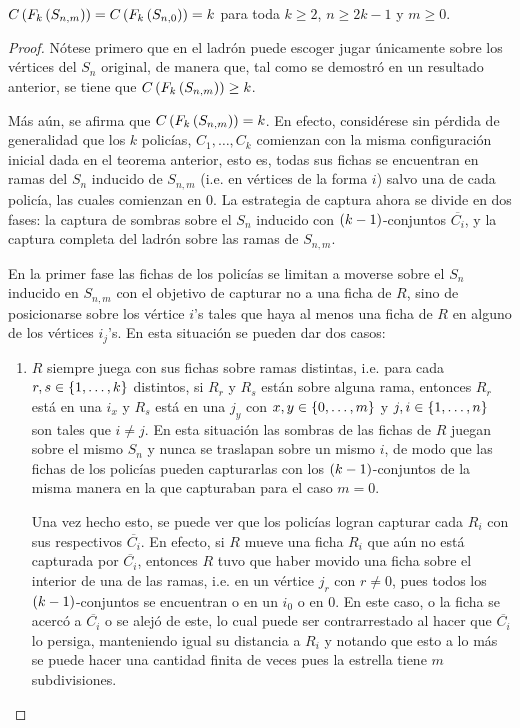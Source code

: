 \begin{teorema}
\label{teo:numero-de-policia-estrella-subdivisiones}
    $C\left( F_k\left( S_{n,m}\right)\right)=C\left( F_k\left( S_{n,0}\right)\right)=k$ para toda $k\geq 2$, $n\geq
    2k-1$ y $m\geq 0$.
\end{teorema}
\begin{proof}
    N\'otese primero que en  el ladr\'on puede escoger jugar \'unicamente sobre los
    v\'ertices del $S_n$ original, de manera que, tal como se demostr\'o en un
    resultado anterior, se tiene que $C\left( F_k\left( S_{n,m}\right)\right)\geq k$.

    M\'as a\'un, se afirma que $C\left( F_k\left( S_{n,m}\right)\right)=k$. En efecto, consid\'erese sin
    p\'erdida de generalidad que los $k$ polic\'ias, $C_1,\dots, C_k$ comienzan con
    la misma configuraci\'on inicial dada en el teorema anterior, esto es, todas
    sus fichas se encuentran en ramas del $S_n$ inducido de $S_{n,m}$ (i.e. en
    v\'ertices de la forma $i$) salvo una de cada polic\'ia, las cuales comienzan en
    $0$. La estrategia de captura ahora se divide en dos fases: la captura de
    sombras sobre el $S_n$ inducido con $\left( k-1\right)$-conjuntos $\overline{C_i}$, y
    la captura completa del ladr\'on sobre las ramas de $S_{n,m}$.

    En la primer fase las fichas de los polic\'ias se limitan a moverse sobre el
    $S_n$ inducido en $S_{n,m}$ con el objetivo de capturar no a una ficha de
    $R$, sino de posicionarse sobre los v\'ertice $i$'s tales que haya al menos
    una ficha de $R$ en alguno de los v\'ertices $i_j$'s. En esta situaci\'on se
    pueden dar dos casos:
        \begin{enumerate}
            \item $R$ siempre juega con sus fichas sobre ramas distintas, i.e.
            para cada $r,s\in \{1,\dots, k\}$ distintos, si $R_r$ y $R_s$ est\'an
            sobre alguna rama, entonces $R_r$ est\'a en una $i_{x}$ y $R_s$ est\'a
            en una $j_{y}$ con $x,y\in \{0,\dots, m\}$ y $j,i\in \{1,\dots, n\}$ son
            tales que $i\neq j$. En esta situaci\'on las sombras de las fichas de
            $R$ juegan sobre el mismo $S_n$ y nunca se traslapan sobre un mismo
            $i$, de modo que las fichas de los polic\'ias pueden capturarlas con
            los $\left( k-1\right)$-conjuntos de la misma manera en la que capturaban para
            el caso $m=0$.
            
            Una vez hecho esto, se puede ver que los polic\'ias logran capturar
            cada $R_i$ con sus respectivos $\overline{C_i}$. En efecto, si $R$
            mueve una ficha $R_i$ que a\'un no est\'a capturada por $\overline{C_i}$,
            entonces $R$ tuvo que haber movido una ficha sobre el interior de
            una de las ramas, i.e. en un v\'ertice $j_r$ con $r\neq 0$, pues todos
            los $\left( k-1\right)$-conjuntos se encuentran o en un $i_0$ o en $0$. En
            este caso, o la ficha se acerc\'o a $\overline{C_i}$ o se alej\'o de
            este, lo cual puede ser contrarrestado al hacer que $\overline{C_i}$
            lo persiga, manteniendo igual su distancia a $R_i$ y notando que
            esto a lo m\'as se puede hacer una cantidad finita de veces pues la
            estrella tiene $m$ subdivisiones.
            

\end{enumerate}
\end{proof}
